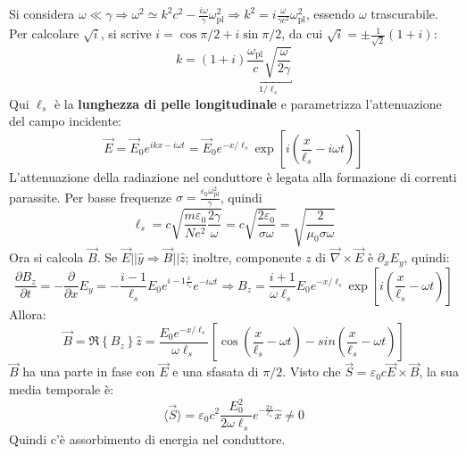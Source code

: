 \documentclass[a4paper]{scrartcl}
\numberwithin{equation}{subsection}
\theoremstyle{style1}
\begin{document}
Si considera $\omega \ll \gamma\Rightarrow \omega ^2 \simeq k^2 c^2 - \frac{i\omega}{\gamma}\omega_\text{pl}^2	\Rightarrow k^2 = i \frac{\omega}{\gamma c^2}\omega_\text{pl}^2$, essendo $\omega$ trascurabile. Per calcolare $\sqrt{i} $, si scrive $i = \cos \pi / 2 + i \sin \pi / 2$, da cui $\sqrt{ i } = \pm \frac{1}{\sqrt{2} }(1+i)$:
\begin{equation}
	k = (1+i) \underbracket{\frac{\omega_\text{pl}}{c} \sqrt{\frac{\omega}{2 \gamma}} }_{1 / \ell _s} 
\end{equation}
Qui $\ell _s$ \`e la \textbf{lunghezza di pelle longitudinale} e parametrizza l'attenuazione del campo incidente:
\begin{equation}
\vec{E}= \vec{E}_0 e^{ ikx - i\omega t} = \vec{E}_0 e^{-x / \ell _s} \exp \left[ i \left(\frac{x}{\ell _s} - i\omega t\right)  \right]
\end{equation}
L'attenuazione della radiazione nel conduttore \`e legata alla formazione di correnti parassite. Per basse frequenze $\sigma = \frac{\varepsilon _0 \omega_\text{pl}^2}{\gamma}$, quindi
\begin{equation}
	\ell _s =c \sqrt{\frac{m\varepsilon _0}{Ne^2} \frac{2\gamma}{\omega}}  =c \sqrt{\frac{2\varepsilon _0}{\sigma \omega}} = \sqrt{\frac{2}{\mu_0 \sigma \omega}}  
\end{equation}
Ora si calcola $\vec{B}$. Se $\vec{E}| | \hat{y}\Rightarrow \vec{B} | | \hat{z}$; inoltre, componente $z$ di $\vec{\nabla }\times \vec{E}$ \`e $\partial _x E_y$, quindi:
\[
\frac{\partial B_z}{\partial t} = - \frac{\partial }{\partial x} E_y = - \frac{i-1}{\ell _s} E_0 e^{i-1 \frac{x}{\ell _s}} e^{-i\omega t}  \Rightarrow B_z = \frac{i+1}{\omega \ell _s} E_0 e^{ - x / \ell _s} \exp \left[ i \left(\frac{x}{\ell _s}-\omega t\right)  \right]  
\] 
Allora:
\begin{equation}
	\vec{B}=\Re \left\{ B_z \right\} \hat{z}= \frac{E_0 e^{- x / \ell _s} }{\omega \ell _s} \left[ \cos \left(\frac{x}{\ell _s}-\omega t\right) - sin \left(\frac{x}{\ell _s}-\omega t\right)  \right] 
\end{equation}
$\vec{B}$ ha una parte in fase con $\vec{E}$ e una sfasata di $\pi / 2$. Visto che $\vec{S}=\varepsilon _0 c \vec{E}\times \vec{B}$, la sua media temporale \`e:
\begin{equation}
	\langle \vec{S} \rangle= \varepsilon _0 c^2 \frac{E_0^2}{2\omega \ell _s} e^{- \frac{2x}{\ell _s}} \hat{ x}\neq 0
\end{equation}
Quindi c'\`e assorbimento di energia nel conduttore.
\end{document}
